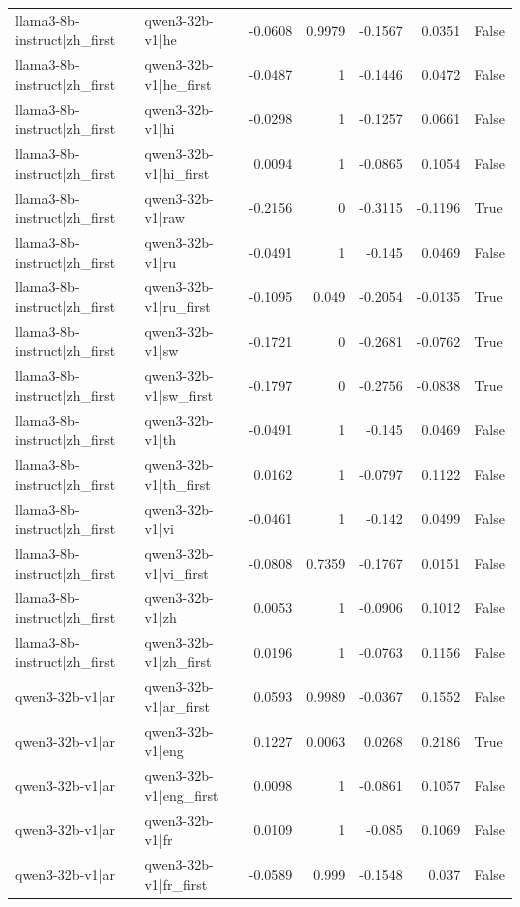 \begin{table}
\begin{tabular}{l l r r r r l}
llama3-8b-instruct|zh_first & qwen3-32b-v1|he & -0.0608 & 0.9979 & -0.1567 & 0.0351 & False \\
llama3-8b-instruct|zh_first & qwen3-32b-v1|he_first & -0.0487 & 1 & -0.1446 & 0.0472 & False \\
llama3-8b-instruct|zh_first & qwen3-32b-v1|hi & -0.0298 & 1 & -0.1257 & 0.0661 & False \\
llama3-8b-instruct|zh_first & qwen3-32b-v1|hi_first & 0.0094 & 1 & -0.0865 & 0.1054 & False \\
llama3-8b-instruct|zh_first & qwen3-32b-v1|raw & -0.2156 & 0 & -0.3115 & -0.1196 & True \\
llama3-8b-instruct|zh_first & qwen3-32b-v1|ru & -0.0491 & 1 & -0.145 & 0.0469 & False \\
llama3-8b-instruct|zh_first & qwen3-32b-v1|ru_first & -0.1095 & 0.049 & -0.2054 & -0.0135 & True \\
llama3-8b-instruct|zh_first & qwen3-32b-v1|sw & -0.1721 & 0 & -0.2681 & -0.0762 & True \\
llama3-8b-instruct|zh_first & qwen3-32b-v1|sw_first & -0.1797 & 0 & -0.2756 & -0.0838 & True \\
llama3-8b-instruct|zh_first & qwen3-32b-v1|th & -0.0491 & 1 & -0.145 & 0.0469 & False \\
llama3-8b-instruct|zh_first & qwen3-32b-v1|th_first & 0.0162 & 1 & -0.0797 & 0.1122 & False \\
llama3-8b-instruct|zh_first & qwen3-32b-v1|vi & -0.0461 & 1 & -0.142 & 0.0499 & False \\
llama3-8b-instruct|zh_first & qwen3-32b-v1|vi_first & -0.0808 & 0.7359 & -0.1767 & 0.0151 & False \\
llama3-8b-instruct|zh_first & qwen3-32b-v1|zh & 0.0053 & 1 & -0.0906 & 0.1012 & False \\
llama3-8b-instruct|zh_first & qwen3-32b-v1|zh_first & 0.0196 & 1 & -0.0763 & 0.1156 & False \\
qwen3-32b-v1|ar & qwen3-32b-v1|ar_first & 0.0593 & 0.9989 & -0.0367 & 0.1552 & False \\
qwen3-32b-v1|ar & qwen3-32b-v1|eng & 0.1227 & 0.0063 & 0.0268 & 0.2186 & True \\
qwen3-32b-v1|ar & qwen3-32b-v1|eng_first & 0.0098 & 1 & -0.0861 & 0.1057 & False \\
qwen3-32b-v1|ar & qwen3-32b-v1|fr & 0.0109 & 1 & -0.085 & 0.1069 & False \\
qwen3-32b-v1|ar & qwen3-32b-v1|fr_first & -0.0589 & 0.999 & -0.1548 & 0.037 & False \\

\end{tabular}
\end{table}
